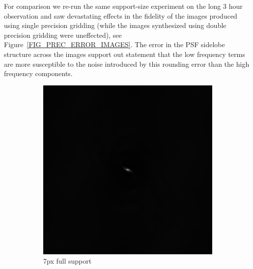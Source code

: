 For comparison we re-run the same support-size experiment on the long 3 hour observation and saw devastating effects in the fidelity of the images produced using single precision gridding (while the images synthesized using double precision
gridding were uneffected), see Figure~\ref{FIG_PREC_ERROR_IMAGES}. The error in the PSF sidelobe structure across the images support out statement that the low frequency terms are more susceptible to the noise introduced by this rounding
error than the high frequency components.
\begin{figure}[ht!]
 \begin{mdframed} \centering
    \begin{subfigure}[b]{0.3\textwidth}\centering
      \includegraphics[width=\textwidth]{images/180min_single_7.png}
      \caption{7px full support}
    \end{subfigure}
    \begin{subfigure}[b]{0.3\textwidth}\centering

\end{subfigure}
\end{mdframed}
\end{figure}
